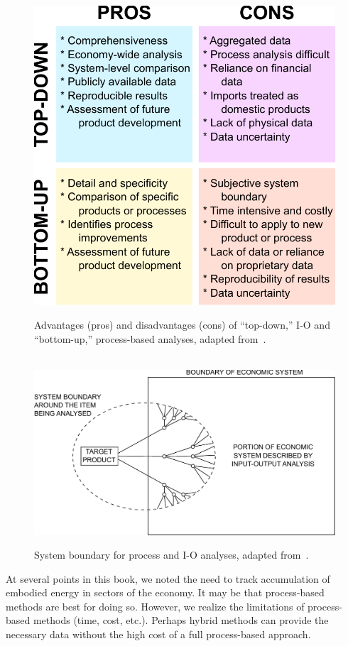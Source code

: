 \begin{figure}[p]
\centering\
\includegraphics[width=0.8\linewidth]{Part_3/Chapter_Unfinished/images/Top_down_vs_bottom_up.pdf}
\caption[Top-down vs.\ bottom-up analyses]{Advantages (pros) and disadvantages (cons) of ``top-down,'' I-O and ``bottom-up,'' process-based analyses, adapted from~\cite{Hendrickson2006}.} %
\label{fig:IO_vs_process}
\end{figure}

\begin{figure}[p]
\centering\
\includegraphics[width=\linewidth]{Part_3/Chapter_Unfinished/images/Hybrid_boundary.pdf}
\caption[System boundary for process and I-O analyses]{System boundary for process and I-O analyses, adapted from~\cite{Bullard:1978vd}.}
\label{fig:Hybrid_boundary}
\end{figure}

At several points in this book,
we noted the need to track accumulation of embodied
energy in sectors of the economy.
It may be that process-based methods are best for doing so.
However, we realize the limitations of process-based
methods (time, cost, etc.).
Perhaps hybrid methods can provide the necessary 
data without the high 
cost of a full process-based approach.


